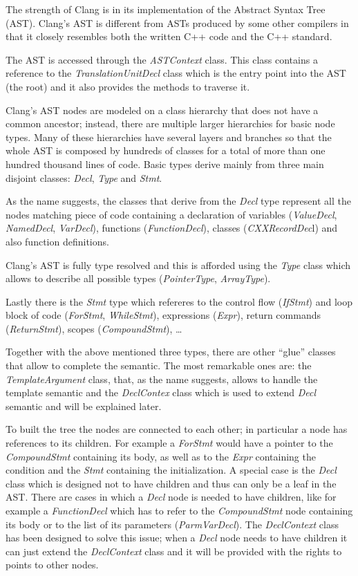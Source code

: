 \documentclass[a4paper,11pt,oneside]{book}
\begin{document}
The strength of Clang is in its implementation of the Abstract Syntax Tree (AST). Clang’s AST is different from ASTs produced by some other compilers in that it closely resembles both the written C++ code and the C++ standard.

The AST is accessed through the \emph{ASTContext} class. This class contains a reference to the \emph{TranslationUnitDecl} class which is the entry point into the AST (the root) and it also provides the methods to traverse it.

Clang’s AST nodes are modeled on a class hierarchy that does not have a common ancestor; instead, there are multiple larger hierarchies for basic node types. Many of these hierarchies have several layers and branches so that the whole AST is composed by hundreds of classes for a total of more than one hundred thousand lines of code. Basic types derive mainly from three main disjoint classes: \emph{Decl}, \emph{Type} and \emph{Stmt}. 

As the name suggests, the classes that derive from the \emph{Decl} type represent all the nodes matching piece of code containing a declaration of variables (\emph{ValueDecl}, \emph{NamedDecl}, \emph{VarDecl}), functions (\emph{FunctionDecl}), classes (\emph{CXXRecordDec}l) and also function definitions.

Clang’s AST is fully type resolved and this is afforded using the \emph{Type} class which allows to describe all possible types (\emph{PointerType}, \emph{ArrayType}).

Lastly there is the \emph{Stmt} type which refereres to the control flow (\emph{IfStmt}) and loop block of code (\emph{ForStmt}, \emph{WhileStmt}), expressions (\emph{Expr}), return commands (\emph{ReturnStmt}), scopes (\emph{CompoundStmt}), \dots 

Together with the above mentioned three types, there are other “glue” classes that allow to complete the semantic. The most remarkable ones are: the \emph{TemplateArgument} class, that, as the name suggests, allows to handle the template semantic and the \emph{DeclContex} class which is used to extend \emph{Decl} semantic and will be explained later. 

To built the tree the nodes are connected to each other; in particular a node has references to its children. For example a \emph{ForStmt} would have a pointer to the \emph{CompoundStmt} containing its body, as well as to the \emph{Expr} containing the condition and the \emph{Stmt} containing the initialization. A special case is the \emph{Decl} class which is designed not to have children and thus can only be a leaf in the AST. There are cases in which a \emph{Decl} node is needed to have children, like for example a \emph{FunctionDecl} which has to refer to the \emph{CompoundStmt} node containing its body or to the list of its parameters (\emph{ParmVarDecl}). The \emph{DeclContext} class has been designed to solve this issue; when a \emph{Decl} node needs to have children it can just extend the \emph{DeclContext} class and it will be provided with the rights to points to other nodes. 
\end{document}
